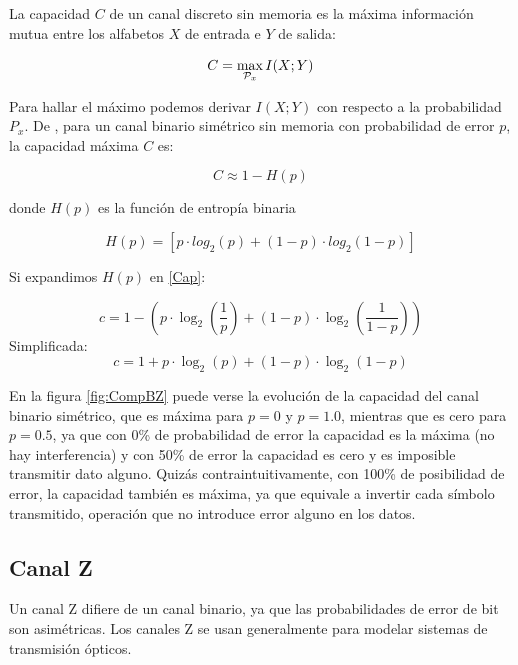 La capacidad $C$ de un canal discreto sin memoria es la máxima información mutua entre los alfabetos $X$ de entrada e $Y$ de salida:

\begin{equation}
C = \max_{{\cal{P}}_x} I(X;Y) 
\end{equation}

Para hallar el máximo podemos derivar $I(X;Y)$ con respecto a la probabilidad $P_x$.
De \cite{MacKay:2002}, para un canal binario simétrico sin memoria con probabilidad de error $p$, la capacidad máxima $C$ es:

\begin{equation}\label{Cap}
C \approx 1 - H(p) 
\end{equation}

donde $H(p)$ es la función de entropía binaria

\begin{equation}\label{Hp}
 H(p) = [p \cdot log_2(p) + (1-p)\cdot log_2 (1-p)]
\end{equation}

Si expandimos $H(p)$ en \ref{Cap}:

$$ c = 1-\left(p \cdot \log_2\left(\frac{1}{p}\right) + (1-p) \cdot \log_2\left(\frac{1}{1-p}\right)\right) $$
Simplificada:
$$ c = 1 + p \cdot \log_2(p) + (1 - p) \cdot \log_2(1-p) $$

En la figura \ref{fig:CompBZ} puede verse la evolución de la capacidad del canal binario simétrico, que es máxima para $p=0$ y $p=1.0$, mientras que es cero para $p=0.5$, ya que con 0\% de probabilidad de error la capacidad es la máxima (no hay interferencia) y con 50\% de error la capacidad es cero y es imposible transmitir dato alguno. Quizás contraintuitivamente, con 100\% de posibilidad de error, la capacidad también es máxima, ya que equivale a invertir cada símbolo transmitido, operación que no introduce error alguno en los datos.


\subsection{Canal Z}
\label{canalZ}
Un canal Z difiere de un canal binario, ya que las probabilidades de error de bit son asimétricas.
Los canales Z se usan generalmente para modelar sistemas de transmisión ópticos.

